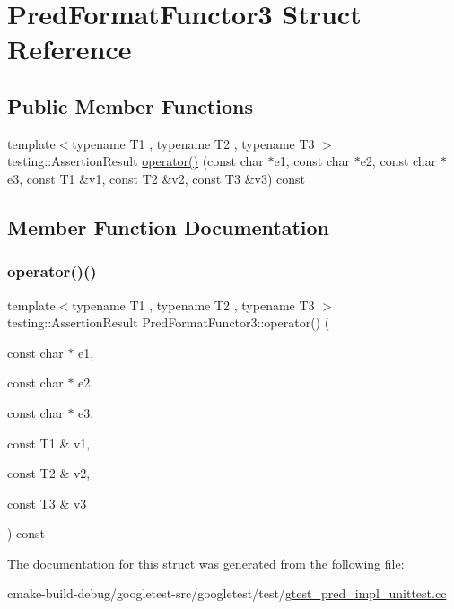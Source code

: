 \hypertarget{structPredFormatFunctor3}{}\section{Pred\+Format\+Functor3 Struct Reference}
\label{structPredFormatFunctor3}
\subsection*{Public Member Functions}
\begin{DoxyCompactItemize}
\item 
{\footnotesize template$<$typename T1 , typename T2 , typename T3 $>$ }\\testing\+::\+Assertion\+Result \mbox{\hyperlink{structPredFormatFunctor3_a35575b0ed1e572d3a31603b07a3f6b30}{operator()}} (const char $\ast$e1, const char $\ast$e2, const char $\ast$e3, const T1 \&v1, const T2 \&v2, const T3 \&v3) const
\end{DoxyCompactItemize}


\subsection{Member Function Documentation}
\mbox{\label{structPredFormatFunctor3_a35575b0ed1e572d3a31603b07a3f6b30}} 
\subsubsection{\texorpdfstring{operator()()}{operator()()}}
{\footnotesize\ttfamily template$<$typename T1 , typename T2 , typename T3 $>$ \\
testing\+::\+Assertion\+Result Pred\+Format\+Functor3\+::operator() (\begin{DoxyParamCaption}\item[{const char $\ast$}]{e1,  }\item[{const char $\ast$}]{e2,  }\item[{const char $\ast$}]{e3,  }\item[{const T1 \&}]{v1,  }\item[{const T2 \&}]{v2,  }\item[{const T3 \&}]{v3 }\end{DoxyParamCaption}) const\hspace{0.3cm}{\ttfamily [inline]}}



The documentation for this struct was generated from the following file\+:\begin{DoxyCompactItemize}
\item 
cmake-\/build-\/debug/googletest-\/src/googletest/test/\mbox{\hyperlink{gtest__pred__impl__unittest_8cc}{gtest\+\_\+pred\+\_\+impl\+\_\+unittest.\+cc}}\end{DoxyCompactItemize}
